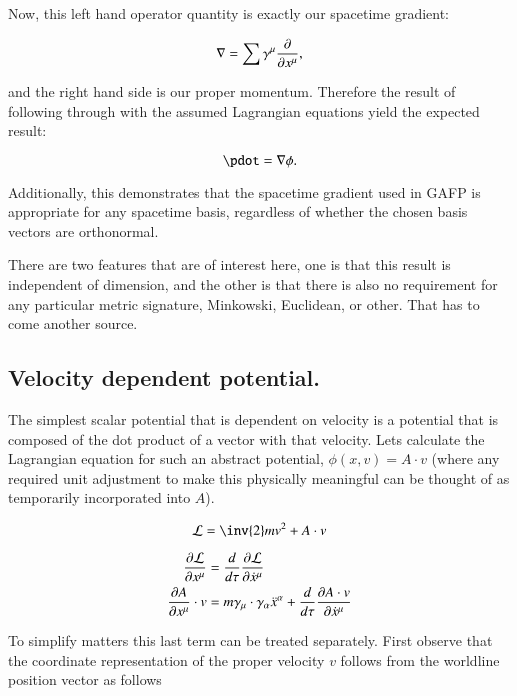 Now, this left hand operator quantity is exactly our spacetime gradient:

\begin{equation}
\nabla = \sum \gamma^{\mu} \frac{\partial}{\partial x^{\mu}},
\end{equation}

and the right hand side is our proper momentum.  Therefore the result of following through with the assumed Lagrangian equations yield the expected result:

\begin{equation}
\pdot = \grad \phi.
\end{equation}

Additionally, this demonstrates that the spacetime gradient used in GAFP is appropriate for any spacetime basis, regardless of whether the chosen basis vectors are orthonormal.

There are two features that are of interest here, one is that this result is independent of dimension, and the other is that there is also no requirement for any particular metric signature, Minkowski, Euclidean, or other.  That has to come another source.

\subsection{Velocity dependent potential. }

The simplest scalar potential that is dependent on velocity is a potential that is composed of the dot product of a vector with that velocity.  Lets calculate the Lagrangian
equation for such an abstract potential, $\phi(x,v) = A \cdot v$ (where any required unit adjustment to make this physically meaningful can be thought of as temporarily incorporated into $A$).

\begin{equation}
\mathcal{L} = \inv{2}m v^2 + A \cdot v
\end{equation}

\begin{align*}
\frac{\partial \mathcal{L}}{\partial x^{\mu}} &= \frac{d}{d\tau} \frac{\partial \mathcal{L}}{\partial \dot{x}^{\mu}} \\
\frac{\partial A}{\partial x^{\mu}} \cdot v &= m \gamma_{\mu} \cdot \gamma_{\alpha} \ddot{x}^{\alpha} +\frac{d}{d\tau} \frac{\partial A \cdot v}{\partial \dot{x}^{\mu}} \\
\end{align*}

To simplify matters this last term can be treated separately.  First observe that the coordinate representation of the proper velocity $v$ follows from the worldline
position vector as follows


